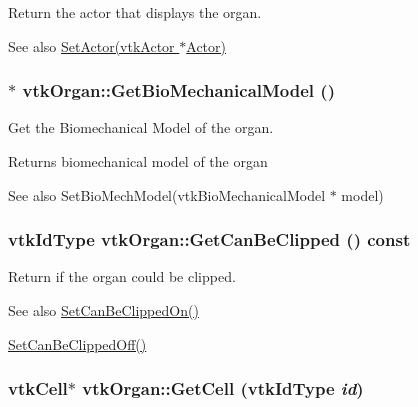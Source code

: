Return the actor that displays the organ. \begin{DoxySeeAlso}{See also}
\hyperlink{classvtkOrgan_a7368fa68add5a80b7b80989df1894233}{SetActor(vtkActor $\ast$Actor)} 
\end{DoxySeeAlso}
\hypertarget{classvtkOrgan_a557162900b7880dac34acca512bcebd0}{
\subsubsection[{GetBioMechanicalModel}]{ $\ast$ vtkOrgan::GetBioMechanicalModel ()}}
\label{classvtkOrgan_a557162900b7880dac34acca512bcebd0}


Get the Biomechanical Model of the organ. \begin{DoxyReturn}{Returns}
biomechanical model of the organ 
\end{DoxyReturn}
\begin{DoxySeeAlso}{See also}
SetBioMechModel(vtkBioMechanicalModel $\ast$ model) 
\end{DoxySeeAlso}
\hypertarget{classvtkOrgan_a3a20226df6f6df2a83b2ee0be190c452}{
\subsubsection[{GetCanBeClipped}]{\setlength{\rightskip}{0pt plus 5cm}vtkIdType vtkOrgan::GetCanBeClipped () const}}
\label{classvtkOrgan_a3a20226df6f6df2a83b2ee0be190c452}


Return if the organ could be clipped. \begin{DoxySeeAlso}{See also}
\hyperlink{classvtkOrgan_a65da602da9636309dcfa094b537a9fef}{SetCanBeClippedOn()} 

\hyperlink{classvtkOrgan_a6faee69d6495879b5f545bf1446dd304}{SetCanBeClippedOff()} 
\end{DoxySeeAlso}
\hypertarget{classvtkOrgan_a715bbd46dbfc1838b2d76135126ac59c}{
\subsubsection[{GetCell}]{\setlength{\rightskip}{0pt plus 5cm}vtkCell$\ast$ vtkOrgan::GetCell (vtkIdType {\em id})}}
\label{classvtkOrgan_a715bbd46dbfc1838b2d76135126ac59c}


